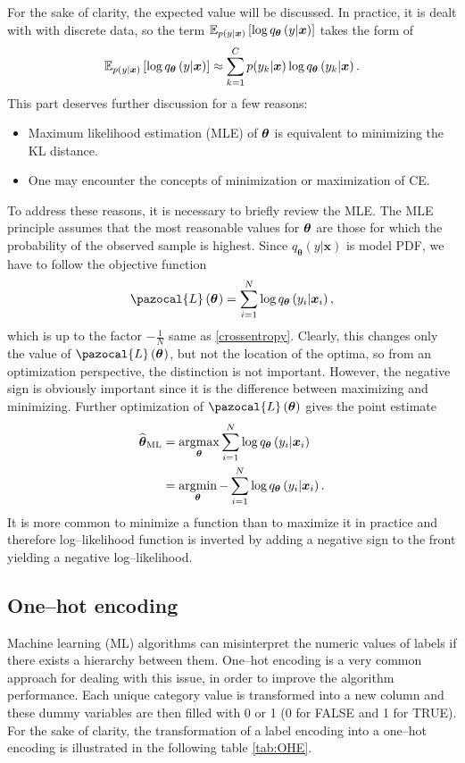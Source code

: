 For the sake of clarity, the expected value will be discussed. In practice, it is dealt with with discrete data, so the term $\mathbb{E}_{ p(y| \boldsymbol{x})}\left[\log q_{\boldsymbol{\theta}}\left(y|\boldsymbol{x}\right)\right]$ takes the form of
\begin{equation}
    \mathbb{E}_{p(y| \boldsymbol{x})}\left[\log q_{\boldsymbol{\theta}}\left(y|\boldsymbol{x}\right)\right] \approx \sum_{k=1}^C p(y_k| \boldsymbol{x})\log q_{\boldsymbol{\theta}}\left(y_k|\boldsymbol{x}\right).
\end{equation}
This part deserves further discussion for a few reasons:
\begin{itemize}
    \item Maximum likelihood estimation (MLE) of $\boldsymbol{\theta}$ is equivalent to minimizing the KL distance.
    \item One may encounter the concepts of minimization or maximization of CE.
\end{itemize}
To address these reasons, it is necessary to briefly review the MLE. The MLE principle assumes that the most reasonable
values for $\boldsymbol{\theta}$ are those for which the probability of the observed sample is
highest. Since $q_{\boldsymbol{\theta}}\left(y|\boldsymbol{x}\right)$ is model PDF, we have to follow the objective function
\begin{equation}
   \pazocal{L}\left(\bt^{}\right)= \sum_{i=1}^{N}\log q_{\boldsymbol{\theta}}\left(y_i|\boldsymbol{x}_i\right),
\end{equation}
which is up to the factor $-\frac{1}{N}$ same as \eqref{crossentropy}. Clearly, this changes only the value of $\pazocal{L}\left(\bt^{}\right)$, but not the location of the optima, so from an optimization perspective, the distinction is not important. However, the negative sign is obviously important since it is the difference between maximizing and minimizing.
Further optimization of $\pazocal{L}\left(\bt\right)$ gives the point estimate
\begin{align}
    \widehat{\boldsymbol{\theta}}_{\mathrm{ML}} &= \mathop{\mathrm{argmax}}_{\boldsymbol{\theta}} \sum_{i=1}^{N}\log q_{\boldsymbol{\theta}}\left(y_i|\boldsymbol{x}_i\right)\label{eq:argmax}\\ 
    &=\mathop{\mathrm{argmin}}_{\boldsymbol{\theta}} -\sum_{i=1}^{N}\log q_{\boldsymbol{\theta}}\left(y_i|\boldsymbol{x}_i\right)\label{eq:argmin}.
\end{align}
It is more common to minimize a function than to maximize it in practice and therefore log--likelihood function is inverted by adding a negative sign to the front yielding a negative log--likelihood. 
\subsection{One--hot encoding}\label{OHE}
 Machine learning (ML) algorithms can misinterpret the numeric values of labels if there exists a hierarchy between them. One--hot encoding is a very common approach for dealing with this issue, in order to improve the algorithm performance. Each unique category value is transformed into a new column and these dummy variables are then filled with 0 or 1 (0 for FALSE and 1 for TRUE). For the sake of clarity, the transformation of a label encoding into a one--hot encoding is illustrated in the following table \ref{tab:OHE}. 
 
